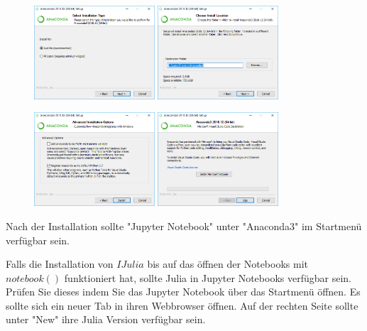 \documentclass[11pt, a4paper]{scrartcl}
\begin{document}
\begin{figure}[H]
	\centering
	\includegraphics[width=0.4\textwidth]{img/install1.png}
	\vspace{0.1\textwidth}
	\includegraphics[width=0.4\textwidth]{img/install2.png}
\end{figure}

\begin{figure}[H]
	\centering
	\includegraphics[width=0.4\textwidth]{img/install3.png}
	\vspace{0.1\textwidth}
	\includegraphics[width=0.4\textwidth]{img/install4.png}
\end{figure}

Nach der Installation sollte "Jupyter Notebook" unter "Anaconda3" im Startmenü verfügbar sein.

Falls die Installation von $IJulia$ bis auf das öffnen der Notebooks mit $notebook()$ funktioniert hat, sollte Julia in Jupyter Notebooks verfügbar sein. Prüfen Sie dieses indem Sie das Jupyter Notebook über das Startmenü öffnen. Es sollte sich ein neuer Tab in ihren Webbrowser öffnen. Auf der rechten Seite sollte unter "New" ihre Julia Version verfügbar sein.
\end{document}
